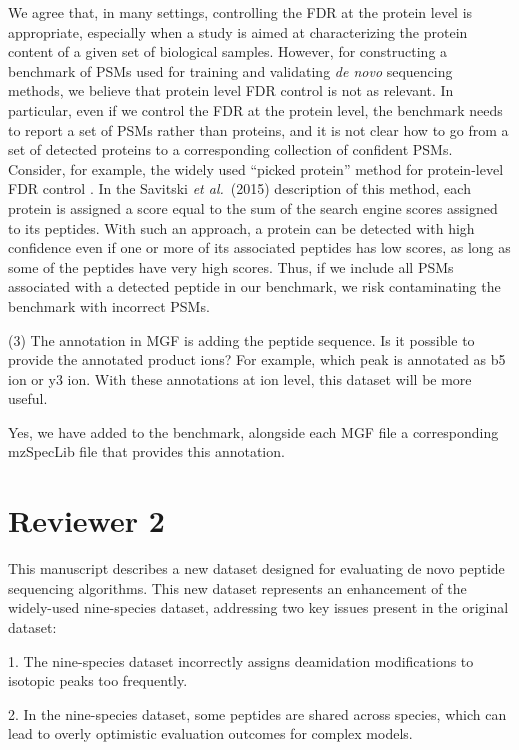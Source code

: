\documentclass{article}
\newcommand{\response}[1]{\vspace*{1ex} \color{blue} \noindent #1 \color{black}
	\vspace*{2ex}}
\begin{document}
\response{We agree that, in many settings, controlling the FDR at the protein level is appropriate, especially when a study is aimed at characterizing the protein content of a given set of biological samples.
  However, for constructing a benchmark of PSMs used for training and validating \textit{de novo} sequencing methods, we believe that protein level FDR control is not as relevant.
  In particular, even if we control the FDR at the protein level, the benchmark needs to report a set of PSMs rather than proteins, and it is not clear how to go from a set of detected proteins to a corresponding collection of confident PSMs.
  Consider, for example, the widely used ``picked protein'' method for protein-level FDR control \cite{savitski2015scalable}.
  In the Savitski \textit{et al.}\ (2015) description of this method, each protein is assigned a score equal to the sum of the search engine scores assigned to its peptides.
  With such an approach, a protein can be detected with high confidence even if one or more of its associated peptides has low scores, as long as some of the peptides have very high scores.
  Thus, if we include all PSMs associated with a detected peptide in our benchmark, we risk contaminating the benchmark with incorrect PSMs.}

(3) The annotation in MGF is adding the peptide sequence. Is it possible to provide the annotated product ions? For example, which peak is annotated as b5 ion or y3 ion. With these annotations at ion level, this dataset will be more useful.

\response{Yes, we have added to the benchmark, alongside each MGF file a corresponding mzSpecLib \cite{klein2024proteomics} file that provides this annotation.}

\clearpage
\section*{Reviewer 2}

This manuscript describes a new dataset designed for evaluating de novo peptide sequencing algorithms. This new dataset represents an enhancement of the widely-used nine-species dataset, addressing two key issues present in the original dataset:

1. The nine-species dataset incorrectly assigns deamidation modifications to isotopic peaks too frequently.

2. In the nine-species dataset, some peptides are shared across species, which can lead to overly optimistic evaluation outcomes for complex models.
\end{document}
